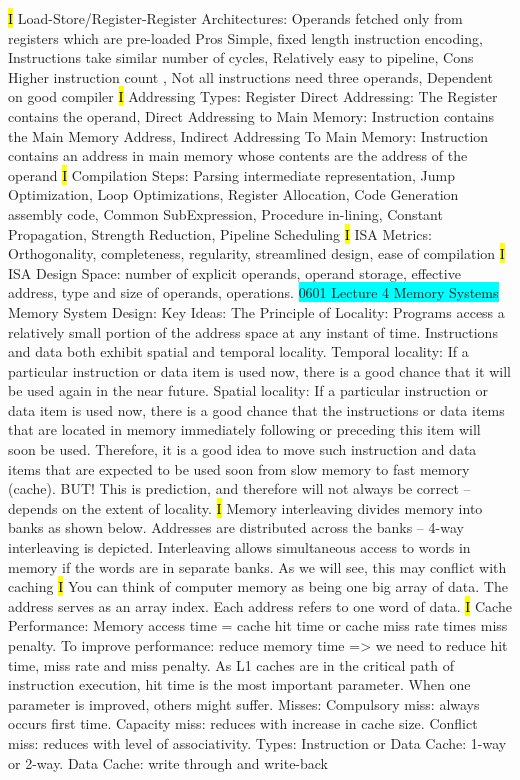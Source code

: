 \documentclass[fontsize=4pt]{scrartcl}
\begin{document}
\hl{I}
Load-Store/Register-Register Architectures: Operands fetched only from registers which are pre-loaded Pros Simple, fixed length instruction encoding, Instructions take similar number of cycles, Relatively easy to pipeline, Cons Higher instruction count , Not all instructions need three operands, Dependent on good compiler
\hl{I}
Addressing Types: Register Direct Addressing: The Register contains the operand, Direct Addressing to Main Memory: Instruction contains the Main Memory Address, Indirect Addressing To Main Memory: Instruction contains an address in main memory whose contents are the address of the operand
\hl{I}
Compilation Steps: Parsing intermediate representation, Jump Optimization, Loop Optimizations, Register Allocation, Code Generation assembly code, Common SubExpression, Procedure in-lining, Constant Propagation, Strength Reduction, Pipeline Scheduling 
\hl{I}
ISA Metrics: Orthogonality, completeness, regularity, streamlined design, ease of compilation
\hl{I}
ISA Design Space: number of explicit operands, operand storage, effective address, type and size of operands, operations.
\colorbox{Cyan}{0601 Lecture 4 Memory Systems} Memory System Design: Key Ideas: The Principle of Locality: Programs access a relatively small portion of the address space at any instant of time. Instructions and data both exhibit spatial and temporal locality. Temporal locality: If a particular instruction or data item is used now, there is a good chance that it will be used again in the near future. Spatial locality: If a particular instruction or data item is used now, there is a good chance that the instructions or data items that are located in memory immediately following or preceding this item will soon be used. Therefore, it is a good idea to move such instruction and data items that are expected to be used soon from slow memory to fast memory (cache). BUT! This is prediction, and therefore will not always be correct – depends on the extent of locality.
\hl{I}
Memory interleaving divides memory into banks as shown below. Addresses are distributed across the banks – 4-way interleaving is depicted. Interleaving allows simultaneous access to words in memory if the words are in separate banks. As we will see, this may conflict with caching
\hl{I}
You can think of computer memory as being one big array of data. The address serves as an array index. Each address refers to one word of data.
\hl{I}
Cache Performance: Memory access time = cache hit time or cache miss rate times miss penalty. To improve performance: reduce memory time  => we need to reduce hit time, miss rate and miss penalty. As L1 caches are in the critical path of instruction execution, hit time is the most important parameter. When one parameter is improved, others might suffer. Misses: Compulsory miss: always occurs first time. Capacity miss: reduces with increase in cache size. Conflict miss: reduces with level of associativity. Types: Instruction or Data Cache: 1-way or 2-way. Data Cache: write through and write-back
\end{document}
